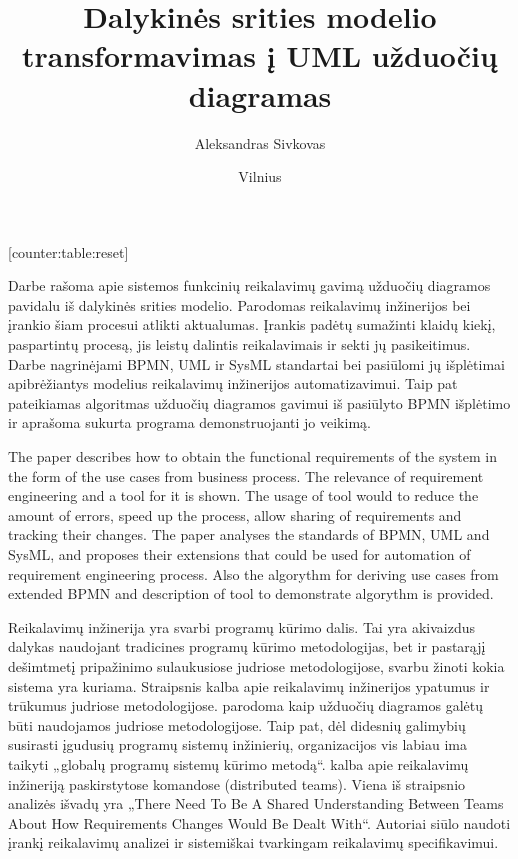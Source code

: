 \documentclass{VUMIFInfBakalaurinis}
\title{Dalykinės srities modelio transformavimas į UML užduočių diagramas}
\author{Aleksandras Sivkovas}
\date{Vilnius \\ \the\year}
\begin{document}
[counter:table:reset]
\newcommand\rownumber{\stepcounter{counter:table}\arabic{counter:table}}

\maketitle


Darbe rašoma apie sistemos funkcinių reikalavimų gavimą užduočių diagramos pavidalu iš dalykinės srities modelio. Parodomas reikalavimų inžinerijos bei įrankio šiam procesui atlikti aktualumas. Įrankis padėtų sumažinti klaidų kiekį, paspartintų procesą, jis leistų dalintis reikalavimais ir sekti jų pasikeitimus. Darbe nagrinėjami BPMN, UML ir SysML standartai bei pasiūlomi jų išplėtimai apibrėžiantys modelius reikalavimų inžinerijos automatizavimui. Taip pat pateikiamas algoritmas užduočių diagramos gavimui iš pasiūlyto BPMN išplėtimo ir aprašoma sukurta programa demonstruojanti jo veikimą.


The paper describes how to obtain the functional requirements of the system in the form of the use cases from business process. The relevance of requirement engineering and a tool for it is shown. The usage of tool would to reduce the amount of errors, speed up the process, allow sharing of requirements and tracking their changes. The paper analyses the standards of BPMN, UML and SysML, and proposes their extensions that could be used for automation of requirement engineering process. Also the algorythm for deriving use cases from extended BPMN and description of tool to demonstrate algorythm is provided.

\tableofcontents



Reikalavimų inžinerija yra svarbi programų kūrimo dalis. Tai yra akivaizdus dalykas naudojant tradicines programų kūrimo metodologijas, bet ir pastarąjį dešimtmetį pripažinimo sulaukusiose judriose metodologijose, svarbu žinoti kokia sistema yra kuriama. Straipsnis \cite{reInAgile} kalba apie reikalavimų inžinerijos ypatumus ir trūkumus judriose metodologijose. \cite{jacobson2011usecase} parodoma kaip užduočių diagramos galėtų būti naudojamos judriose metodologijose. Taip pat, dėl didesnių galimybių susirasti įgudusių programų sistemų inžinierių, organizacijos vis labiau ima taikyti „globalų programų sistemų kūrimo metodą“.  \cite{reInGlobalPrograming} kalba apie reikalavimų inžineriją paskirstytose komandose (distributed teams). Viena iš straipsnio analizės išvadų yra „There Need To Be A Shared Understanding Between Teams About How Requirements Changes Would Be Dealt With“. Autoriai siūlo naudoti įrankį reikalavimų analizei ir sistemiškai tvarkingam reikalavimų specifikavimui.
\end{document}
